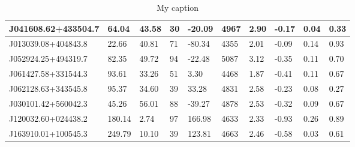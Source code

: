 \documentclass[a4paper,fleqn,usenatbib]{mnras}
\begin{document}
\begin{table}
\begin{tabular}{llllllllll}
J041608.62+433504.7 & 64.04 & 43.58 & 30 & -20.09 & 4967 & 2.90 & -0.17 & 0.04 & 0.33 \\ \hline
J013039.08+404843.8 & 22.66 & 40.81 & 71 & -80.34 & 4355 & 2.01 & -0.09 & 0.14 & 0.93 \\ \hline
J052924.25+494319.7 & 82.35 & 49.72 & 94 & -22.48 & 5087 & 3.12 & -0.35 & 0.11 & 0.70 \\ \hline
J061427.58+331544.3 & 93.61 & 33.26 & 51 & 3.30 & 4468 & 1.87 & -0.41 & 0.11 & 0.67 \\ \hline
J062128.63+343545.8 & 95.37 & 34.60 & 39 & 33.28 & 4831 & 2.58 & -0.23 & 0.08 & 0.27 \\ \hline
J030101.42+560042.3 & 45.26 & 56.01 & 88 & -39.27 & 4878 & 2.53 & -0.32 & 0.09 & 0.67 \\ \hline
J120032.60+024438.2 & 180.14 & 2.74 & 97 & 166.98 & 4633 & 2.33 & -0.93 & 0.26 & 0.89 \\ \hline
J163910.01+100545.3 & 249.79 & 10.10 & 39 & 123.81 & 4663 & 2.46 & -0.58 & 0.03 & 0.61 \\ \hline
\end{tabular}
\caption{My caption}
\label{my-label}
\end{table}
\end{document}
